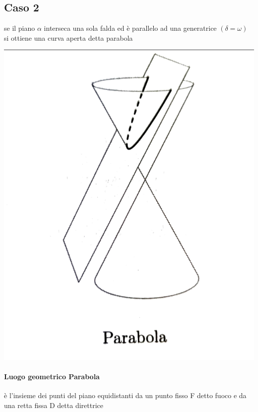 \documentclass[a4paper,11pt]{article}
\begin{document}
\subsection{Caso 2}
se il piano \( \alpha \) interseca una sola falda ed è parallelo ad una generatrice \( ( \delta = \omega) \) si ottiene una curva aperta detta parabola
\begin{center}
\begin{minipage}{8cm}
    \includegraphics[scale=0.3]{parabola.png}
\end{minipage}
\end{center}
\paragraph{Luogo geometrico Parabola}
è l'insieme dei punti del piano equidistanti da un punto fisso F detto fuoco e da una retta fissa D detta direttrice
\end{document}

